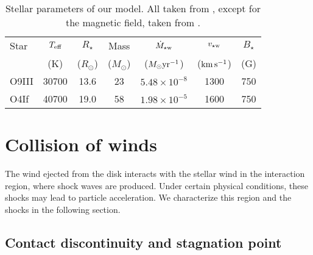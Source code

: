 \documentclass[baaa]{baaa}
\begin{document}
\begin{table}[!h]
\centering
\caption{Stellar parameters of our model. All taken from 
\label{table_stars}\cite{2019yCat..51580073K}, except for the magnetic field, taken from  \cite{2015ASPC..494...30W}.}

\begin{tabular}{lcccccc}
\hline\hline\noalign{\smallskip}
\!\!Star & \!\!\!\!$T_\text{\rm eff}$\!\!\!\! & \!\!\!\!$R_\star$\!\!\!\! & \!\!\!\!Mass\!\!\!\! & \!\!\!\!$\dot{M}_{\star \rm w}$\!\!\!\! & \!\!\!\!$v_{\star \rm w}$\!\!\!\! & \!\!\!\!$B_\star$\!\!\!\! \\
         & \!\!\!\!(\rm K)\!\!\!\! & \!\!\!\!($R_\odot$)\!\!\!\! & \!\!\!\!($M_\odot$)\!\!\!\! & \!\!\!\!($M_\odot \rm {yr^{-1}}$)\!\!\!\! & \!\!\!\!($\rm {km \, s^{-1}}$)\!\!\!\! & \!\!\!\!(\rm G)\!\!\!\! \\
\hline\noalign{\smallskip}
\!\!O9III & 30700 & 13.6 & 23 & $5.48 \times 10^{-8}$ & 1300 & 750 \\
\!\!O4If & 40700 & 19.0 & 58 & $1.98 \times 10^{-5}$ & 1600 & 750 \\
\hline
\end{tabular}
\label{table_1}
\end{table}



\section{Collision of winds}\label{S_collision}
The wind ejected from the disk interacts with the stellar wind in the interaction region, where shock waves are produced. Under certain physical conditions, these shocks may lead to particle acceleration. We characterize this region and the shocks in the following section.
\subsection{Contact discontinuity and stagnation point}
\end{document}
